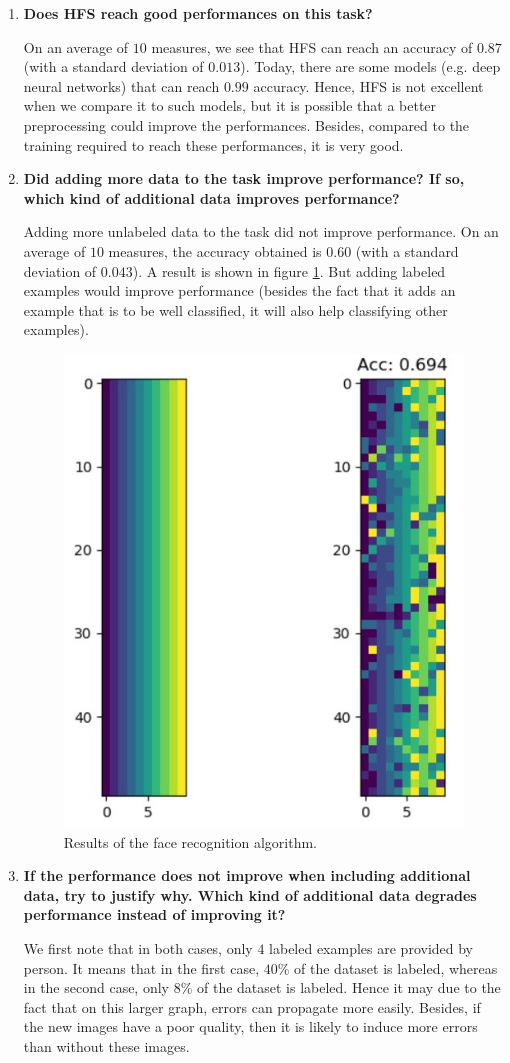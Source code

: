 \documentclass[a4paper, 11pt]{report}
\begin{document}
\begin{enumerate}
	\item \textbf{Does HFS reach good performances on this task?}
	
	On an average of $10$ measures, we see that HFS can reach an accuracy of $0.87$ (with a standard deviation of $0.013$). Today, there are some models (e.g. deep neural networks) that can reach $0.99$ accuracy. Hence, HFS is not excellent when we compare it to such models, but it is possible that a better preprocessing could improve the performances. Besides, compared to the training required to reach these performances, it is very good.
	
	\item \textbf{Did adding more data to the task improve performance? If so, which kind of additional data improves performance?}
	
	Adding more unlabeled data to the task did not improve performance. On an average of $10$ measures, the accuracy obtained is $0.60$ (with a standard deviation of $0.043$). A result is shown in figure \ref{fig:q24-results}. But adding labeled examples would improve performance (besides the fact that it adds an example that is to be well classified, it will also help classifying other examples).

	\begin{figure}[!htb]
	    \centering
	    \includegraphics[width=.3\textwidth]{images/q24_results}
	    \caption{Results of the face recognition algorithm.}
	    \label{fig:q24-results}
	\end{figure}
	
	\item \textbf{If the performance does not improve when including additional data, try to justify why. Which kind of additional data degrades performance instead of improving it?}
	
	We first note that in both cases, only $4$ labeled examples are provided by person. It means that in the first case, $40\%$ of the dataset is labeled, whereas in the second case, only $8\%$ of the dataset is labeled. Hence it may due to the fact that on this larger graph, errors can propagate more easily. Besides, if the new images have a poor quality, then it is likely to induce more errors than without these images.
	
\end{enumerate}
\end{document}
